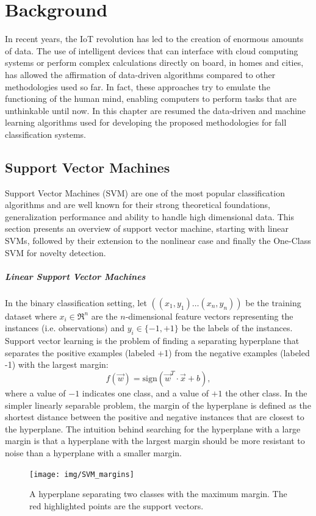 \chapter{Background}\label{ch:backg}
In recent years, the IoT revolution has led to the creation of enormous amounts of data. The use of intelligent devices that can interface with cloud computing systems or perform complex calculations directly on board, in homes and cities, has allowed the affirmation of data-driven algorithms compared to other methodologies used so far. In fact, these approaches try to emulate the functioning of the human mind, enabling computers to perform tasks that are unthinkable until now. 
In this chapter are resumed the data-driven and machine learning algorithms used for developing the proposed methodologies for fall classification systems.

\section{Support Vector Machines}
Support Vector Machines (SVM) \cite{cortes95} are one of the most popular classification algorithms and are well known for their strong theoretical foundations, generalization performance and ability to handle high dimensional data.
This section presents an overview of support vector machine, starting with linear
SVMs, followed by their extension to the nonlinear case and finally the One-Class SVM for novelty detection.

\paragraph{Linear Support Vector Machines}
In the binary classification setting, let $((x_1, y_1)\dots(x_n, y_n))$ be the training dataset where $x_i \in \Re^n$ are the $n$-dimensional feature vectors representing the instances (i.e. observations) and  $y_i \in \{-1, +1\}$ be the labels of the instances. Support vector learning is the problem of finding a separating hyperplane that separates the positive examples (labeled +1) from the negative examples (labeled -1) with the largest margin:
\begin{equation}
f(\vec{w}) =  \mbox{sign} (\vec{w}^T \cdot \vec{x} + b),
\end{equation} 
where a value of $-1$ indicates one class, and a value of $+1$ the other class.
In the simpler linearly separable problem, the margin of the hyperplane is defined as the shortest distance between the positive and negative instances that are closest to the hyperplane. The intuition behind searching for the hyperplane with a large margin is that a hyperplane with the largest margin should be more resistant to noise than a hyperplane with a smaller margin.
\begin{figure}
	\centering
	\texttt{[image: img/SVM\_margins]}
	\caption{A hyperplane separating two classes with the maximum margin. The red highlighted points are the support vectors.
	}
	\label{fig:SVM_margins}
\end{figure} 

